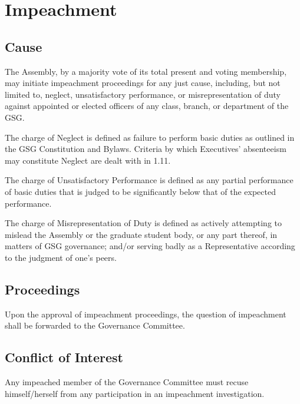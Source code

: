 \chapter{Impeachment}
\section{Cause}
The Assembly, by a majority vote of its total present and voting membership, may initiate impeachment proceedings for any just cause, including, but not limited to, neglect, unsatisfactory performance, or misrepresentation of duty against appointed or elected officers of any class, branch, or department of the GSG.
\begin{bylaws-number}
  \item The charge of Neglect is defined as failure to perform basic duties as outlined in the GSG Constitution and Bylaws. Criteria by which Executives’ absenteeism may constitute Neglect are dealt with in 1.11.
  \item The charge of Unsatisfactory Performance is defined as any partial performance of basic duties that is judged to be significantly below that of the expected performance.
  \item The charge of Misrepresentation of Duty is defined as actively attempting to mislead the Assembly or the graduate student body, or any part thereof, in matters of GSG governance; and/or serving badly as a Representative according to the judgment of one’s peers.
\end{bylaws-number}

\section{Proceedings}
Upon the approval of impeachment proceedings, the question of impeachment shall be forwarded to the Governance Committee.

\section{Conflict of Interest}
Any impeached member of the Governance Committee must recuse himself/herself from any participation in an impeachment investigation.